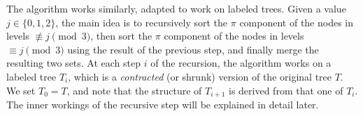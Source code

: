 The {\pathsort} algorithm works similarly, adapted to work on labeled trees.
Given a value $j\in\{0,1,2\}$, the main idea is to recursively sort the $\pi$ component of the nodes in levels $\not\equiv j \pmod{3}$, then sort the $\pi$ component of the nodes in levels $\equiv j \pmod{3}$ using the result of the previous step, and finally merge the resulting two sets. %
At each step $i$ of the recursion, the algorithm works on a labeled tree $T_i$, which is a \emph{contracted} (or shrunk) version of the original tree $T$. 
We set $T_0 = T$, and note that the structure of $T_{i+1}$ is derived from that one of $T_i$.
The inner workings of the recursive step will be explained in detail later.

